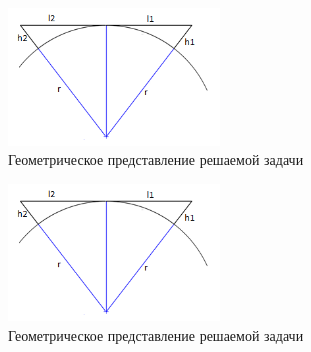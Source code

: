 \begin{figure}[H]
	\centering
	\includegraphics[width=0.5\textwidth]{img/kich_bur/image8.png}
	\caption{Геометрическое представление решаемой задачи}
	\label{fig:img11}
\end{figure}



\begin{figure}[H]
	\centering
	\includegraphics[width=0.5\textwidth]{img/kich_bur/image8.png}
	\caption{Геометрическое представление решаемой задачи}
	\label{fig:img12}
\end{figure}

\newpage